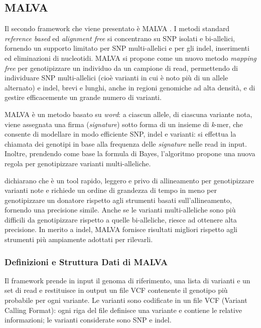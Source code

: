 \documentclass[../main.tex]{subfiles}
\begin{document}
\subsection{MALVA}
\label{malva}

Il secondo framework che viene presentato è MALVA \cite{bernardini2019malva}. I metodi standard \textit{reference based} ed \textit{alignment free} si concentrano su SNP isolati e bi-allelici, fornendo un supporto limitato per SNP multi-allelici e per gli indel, inserimenti ed eliminazioni di nucleotidi. MALVA si propone come un nuovo metodo \textit{mapping free} per genotipizzare un individuo da un campione di read, permettendo di individuare SNP multi-allelici (cioè varianti in cui è noto più di un allele alternato) e indel, brevi e lunghi, anche in regioni genomiche ad alta densità, e di gestire efficacemente un grande numero di varianti. 

MALVA è un metodo basato su \textit{word}: a ciascun allele, di ciascuna variante nota, viene assegnata una firma (\textit{signature}) sotto forma di un insieme di \textit{k}-mer, che consente di modellare in modo efficiente SNP, indel e varianti: si effettua la chiamata dei genotipi in base alla frequenza delle \textit{signature} nelle read in input. Inoltre, prendendo come base la formula di Bayes, l'algoritmo propone una nuova regola per genotipizzare varianti multi-alleliche.

\cite{bernardini2019malva} dichiarano che è un tool rapido, leggero e privo di allineamento per genotipizzare varianti note e richiede un ordine di grandezza di tempo in meno per genotipizzare un donatore rispetto agli strumenti basati sull'allineamento, fornendo una precisione simile. Anche se le varianti multi-alleliche sono più difficili da genotipizzare rispetto a quelle bi-alleliche, riesce ad ottenere alta precisione. In merito a indel, MALVA fornisce risultati migliori rispetto agli strumenti più ampiamente adottati per rilevarli. 


\subsubsection{Definizioni e Struttura Dati di MALVA}

Il framework prende in input il genoma di riferimento, una lista di varianti e un set di read e restituisce in output un file VCF contenente il genotipo più probabile per ogni variante. Le varianti sono codificate in un file VCF (Variant Calling Format): ogni riga del file definisce una variante e contiene le relative informazioni; le varianti considerate sono SNP e indel.
\end{document}
